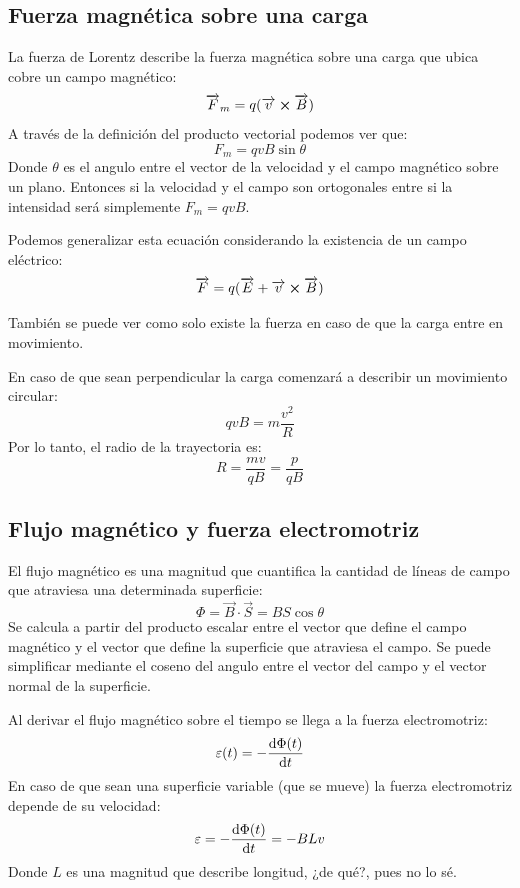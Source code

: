 \documentclass[arial,a4paper,print]{article}
\begin{document}
\subsection{Fuerza magnética sobre una carga}
La fuerza de Lorentz describe la fuerza magnética sobre una carga que ubica cobre un campo magnético:
\begin{equation*}
	\overrightarrow{F}_{m} = q(\overrightarrow{v}\cross\overrightarrow{B})
\end{equation*}
A través de la definición del producto vectorial podemos ver que:
\begin{equation*}
	F_{m} = qvB\sin\theta 
\end{equation*}
Donde $\theta$ es el angulo entre el vector de la velocidad y el campo magnético sobre un plano.
Entonces si la velocidad y el campo son ortogonales entre si la intensidad será simplemente $F_{m}=qvB$. 

Podemos generalizar esta ecuación considerando la existencia de un campo eléctrico:
\begin{equation*}
	\overrightarrow{F} = q(\overrightarrow{E} + \overrightarrow{v}\cross\overrightarrow{B})
\end{equation*}

También se puede ver como solo existe la fuerza en caso de que la carga entre en movimiento.

En caso de que sean perpendicular la carga comenzará a describir un movimiento circular:
\begin{equation*}
	qvB=m\frac{v^{2}}{R}
\end{equation*}
Por lo tanto, el radio de la trayectoria es:
\begin{equation*}
	R=\frac{mv}{qB} = \frac{p}{qB}
\end{equation*}

\subsection{Flujo magnético y fuerza electromotriz}

El flujo magnético es una magnitud que cuantifica la cantidad de líneas de campo que atraviesa una determinada superficie:
\begin{equation*}
	\Phi = \overrightarrow{B}\cdot\overrightarrow{S} = BS\cos\theta
\end{equation*}
Se calcula a partir del producto escalar entre el vector que define el campo magnético y el vector que define la superficie que atraviesa el campo. Se puede simplificar mediante el coseno del angulo entre el vector del campo y el vector normal de la superficie. 

Al derivar el flujo magnético sobre el tiempo se llega a la fuerza electromotriz:
\begin{equation*}
	\varepsilon(t) = -\dv{\Phi(t)}{t}
\end{equation*}
En caso de que sean una superficie variable (que se mueve) la fuerza electromotriz depende de su velocidad:
\begin{equation*}
	\varepsilon = -\dv{\Phi(t)}{t} = -BLv
\end{equation*}
Donde $L$ es una magnitud que describe longitud, ¿de qué?, pues no lo sé. 
\end{document}
